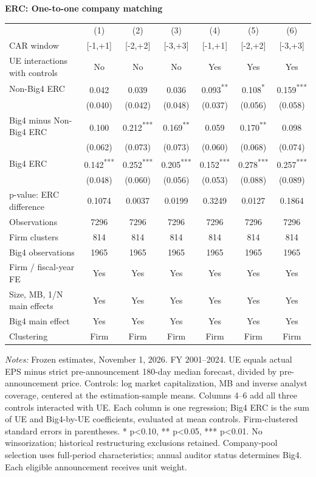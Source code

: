 \documentclass[10pt]{article}
\newcommand{\sym}[1]{\textsuperscript{#1}}
\begin{document}
\fontsize{10}{12}\selectfont
\noindent\textbf{ERC: One-to-one company matching}\par\medskip
\setlength{\tabcolsep}{3pt}\renewcommand{\arraystretch}{1.15}
\noindent\begin{tabular*}{\textwidth}{@{\extracolsep{\fill}}lcccccc@{}}
\toprule
 & (1) & (2) & (3) & (4) & (5) & (6) \\
CAR window & [-1,+1] & [-2,+2] & [-3,+3] & [-1,+1] & [-2,+2] & [-3,+3] \\
UE interactions with controls & No & No & No & Yes & Yes & Yes \\
\midrule
Non-Big4 ERC & 0.042\sym{} & 0.039\sym{} & 0.036\sym{} & 0.093\sym{**} & 0.108\sym{*} & 0.159\sym{***} \\
 & (0.040) & (0.042) & (0.048) & (0.037) & (0.056) & (0.058) \\
Big4 minus Non-Big4 ERC & 0.100\sym{} & 0.212\sym{***} & 0.169\sym{**} & 0.059\sym{} & 0.170\sym{**} & 0.098\sym{} \\
 & (0.062) & (0.073) & (0.073) & (0.060) & (0.068) & (0.074) \\
Big4 ERC & 0.142\sym{***} & 0.252\sym{***} & 0.205\sym{***} & 0.152\sym{***} & 0.278\sym{***} & 0.257\sym{***} \\
 & (0.048) & (0.060) & (0.056) & (0.053) & (0.088) & (0.089) \\
p-value: ERC difference & 0.1074 & 0.0037 & 0.0199 & 0.3249 & 0.0127 & 0.1864 \\
Observations & 7296 & 7296 & 7296 & 7296 & 7296 & 7296 \\
Firm clusters & 814 & 814 & 814 & 814 & 814 & 814 \\
Big4 observations & 1965 & 1965 & 1965 & 1965 & 1965 & 1965 \\
Firm / fiscal-year FE & Yes & Yes & Yes & Yes & Yes & Yes \\
Size, MB, 1/N main effects & Yes & Yes & Yes & Yes & Yes & Yes \\
Big4 main effect & Yes & Yes & Yes & Yes & Yes & Yes \\
Clustering & Firm & Firm & Firm & Firm & Firm & Firm \\
\bottomrule
\end{tabular*}
\par\medskip\fontsize{9}{11}\selectfont\noindent\textit{Notes:} Frozen estimates, November 1, 2026. FY 2001--2024. UE equals actual EPS minus strict pre-announcement 180-day median forecast, divided by pre-announcement price. Controls: log market capitalization, MB and inverse analyst coverage, centered at the estimation-sample means. Columns 4--6 add all three controls interacted with UE. Each column is one regression; Big4 ERC is the sum of UE and Big4-by-UE coefficients, evaluated at mean controls. Firm-clustered standard errors in parentheses. * p<0.10, ** p<0.05, *** p<0.01. No winsorization; historical restructuring exclusions retained. Company-pool selection uses full-period characteristics; annual auditor status determines Big4. Each eligible announcement receives unit weight.
\end{document}
